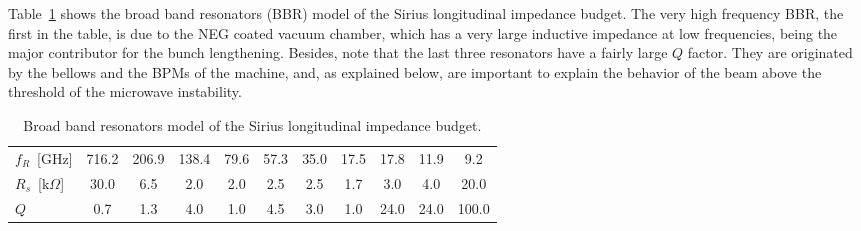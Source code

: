 \begin{apendicesenv}
    Table~\ref{tab:resonator_model} shows the broad band resonators (BBR) model of the Sirius longitudinal impedance budget. The very high frequency BBR, the first in the table, is due to the NEG coated vacuum chamber, which has a very large inductive impedance at low frequencies, being the major contributor for the bunch lengthening. Besides, note that the last three resonators have a fairly large $Q$ factor. They are originated by the bellows and the BPMs of the machine, and, as explained below, are important to explain the behavior of the beam above the threshold of the microwave instability.
    \begin{table}[t]
        \centering
        \caption{Broad band resonators model of the Sirius longitudinal impedance budget.}
        \label{tab:resonator_model}
        \begin{tabular}{@{}lcccccccccc@{}}\toprule
            $f_R$~[GHz]       & 716.2 & 206.9  & 138.4  &  79.6  &  57.3
                              &  35.0 &  17.5  & 17.8   &  11.9  &   9.2 \\
            $R_s$~[k$\Omega$] & 30.0  &  6.5   &  2.0   &  2.0   &  2.5
                              &  2.5  &  1.7   &  3.0   &  4.0   &  20.0 \\
            $Q$               &  0.7  &  1.3   &  4.0   &  1.0   &   4.5
                              &  3.0  &  1.0   & 24.0   &  24.0  &  100.0 \\\bottomrule
        \end{tabular}
    \end{table}


\end{apendicesenv}
